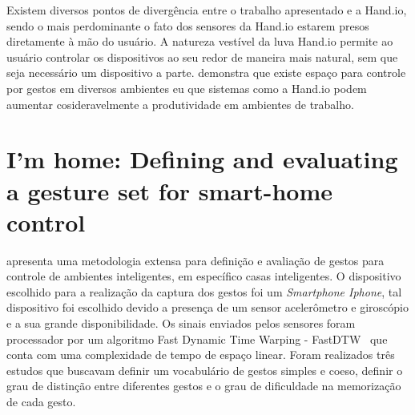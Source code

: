 Existem diversos pontos de divergência entre o trabalho apresentado e a Hand.io, sendo o mais perdominante o fato dos sensores da Hand.io estarem presos diretamente à mão do usuário. A natureza vestível da luva Hand.io permite ao usuário controlar os dispositivos ao seu redor de maneira mais natural, sem que seja necessário um dispositivo a parte.  demonstra que existe espaço para controle por gestos em diversos ambientes eu que sistemas como a Hand.io podem aumentar cosideravelmente a produtividade em ambientes de trabalho.

\begin{comment}
\begin{table}[ht]
	\centering
    \caption{Comparação entre Hand.io e SoapBox}
    \label{tab:comp_soapbox}
	\begin{tabular}{|l|c|c|}
    	\hline
		\textbf{Recursos} & \textbf{Hand.io} & \textbf{SoapBox} \\
        \hline
        \hline
        Preso à mão & x &  \\
        \hline
        Utiliza botões &  & x \\
        \hline
        Captura contínua de sinais & x &  \\
        \hline
        \hline
        \textbf{Sensores} & & \\
        \hline
        \hline
        Acelerômetro & x & x \\
        \hline
        Giroscópio & x & \\
        \hline
        \hline
        \textbf{Contexto aplicado} & Residencial & Estúdio de design \\
        \hline
	\end{tabular}

\end{table}
\end{comment}



\section{I'm home: Defining and evaluating a gesture set for smart-home control}

\label{cor:home}

 apresenta uma metodologia extensa para definição e avaliação de gestos para controle de ambientes inteligentes, em específico casas inteligentes. O dispositivo escolhido para a realização da captura dos gestos foi um \textit{Smartphone Iphone}, tal dispositivo foi escolhido devido a presença de um sensor acelerômetro e giroscópio e a sua grande disponibilidade. Os sinais enviados pelos sensores foram processador por um algoritmo Fast Dynamic Time Warping - FastDTW~\cite{Salvador:2007} que conta com uma complexidade de tempo de espaço linear.
% 
Foram realizados três estudos que buscavam definir um vocabulário de gestos simples e coeso, definir o grau de distinção entre diferentes gestos e o grau de dificuldade na memorização de cada gesto. 


